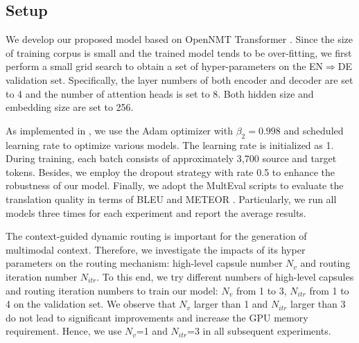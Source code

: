 \documentclass[sigconf]{acmart}
\begin{document}
\begin{table*}[!t]
\begin{tabular}{c|l|c|cc|cc|cc}
\hline
\end{tabular}
\caption{
\label{Table_En2DeMainResults}
Experimental results on the EN$\Rightarrow$DE translation task in terms of BLEU and METEOR. We also calculate statistical significance. $\ddagger$/$\dagger$: significantly better than Transformer ($p$ < 0.01/0.05), **/*: significantly better than Encoder-attention ($p$ < 0.01/0.05), $\bigtriangleup\bigtriangleup$/$\bigtriangleup$: significantly better than Doubly-attention ($p$ < 0.01/0.05). Note that DCCN outperforms most of the existing models and all baselines except for lower METEOR scores than Fusion-conv and Trg-mul, of which model parameters are selected based on METEOR.
\vspace{-10pt}
}
\end{table*}



\subsection{Setup}
We develop our proposed model based on OpenNMT Transformer \cite{klein2017opennmt}.
Since the size of training corpus is small and the trained model tends to be over-fitting, 
we first perform a small grid search to obtain a set of hyper-parameters on the EN$\Rightarrow$DE validation set. Specifically, the layer numbers of both encoder and decoder are set to 4 and the number of attention heads is set to 8. Both hidden size and embedding size are set to 256. 



As implemented in \cite{vaswani2017attention}, we use the Adam optimizer with $\beta_{2}=0.998$ and scheduled learning rate to optimize various models. The learning rate is initialized as 1.
During training, each batch consists of approximately 3,700 source and target tokens. Besides, we employ the dropout strategy \cite{srivastava2014dropout} with rate 0.5 to enhance the robustness of our model. Finally, we adopt the MultEval scripts \cite{clark2011better} to evaluate the translation quality in terms of BLEU \cite{papineni2002bleu} and METEOR \cite{denkowski2011meteor}. 
Particularly, we run all models three times for each experiment and report the average results.


The context-guided dynamic routing is important for the generation of multimodal context. 
Therefore, 
we investigate the impacts of its hyper parameters on the routing mechanism: high-level capsule number $N_v$ and routing iteration number $N_{itr}$. 
To this end, 
we try different numbers of high-level capsules and routing iteration numbers to train our model: $N_v$ from 1 to 3, $N_{itr}$ from 1 to 4 on the validation set. 
We observe that $N_v$ larger than 1 and $N_{itr}$ larger than 3 do not lead to significant improvements and increase the GPU memory requirement. 
Hence, we use $N_v$=1 and $N_{itr}$=3 in all subsequent experiments.
\end{document}
